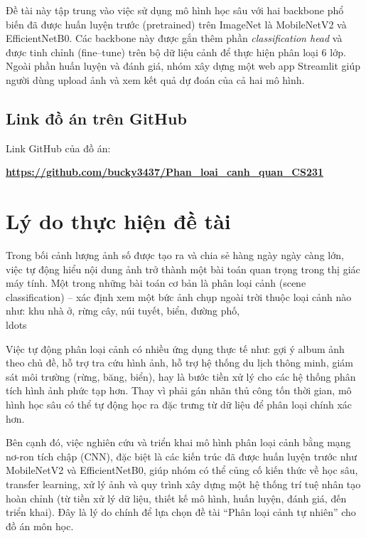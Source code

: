 \documentclass[12pt,a4paper]{article}
\begin{document}
Đề tài này tập trung vào việc sử dụng mô hình học sâu với hai backbone phổ biến đã được huấn luyện trước (pretrained) trên ImageNet là MobileNetV2 và EfficientNetB0. Các backbone này được gắn thêm phần \emph{classification head} và được tinh chỉnh (fine--tune) trên bộ dữ liệu cảnh để thực hiện phân loại 6 lớp. Ngoài phần huấn luyện và đánh giá, nhóm xây dựng một web app Streamlit giúp người dùng upload ảnh và xem kết quả dự đoán của cả hai mô hình.

\subsection{Link đồ án trên GitHub}
Link GitHub của đồ án:
\begin{center}
    \textbf{\url{https://github.com/bucky3437/Phan_loai_canh_quan_CS231}}
\end{center}

\section{Lý do thực hiện đề tài}\label{sec:ly-do}

Trong bối cảnh lượng ảnh số được tạo ra và chia sẻ hàng ngày ngày càng lớn, việc tự động hiểu nội dung ảnh trở thành một bài toán quan trọng trong thị giác máy tính. Một trong những bài toán cơ bản là phân loại cảnh (scene classification) -- xác định xem một bức ảnh chụp ngoài trời thuộc loại cảnh nào như: khu nhà ở, rừng cây, núi tuyết, biển, đường phố, \\ldots

Việc tự động phân loại cảnh có nhiều ứng dụng thực tế như: gợi ý album ảnh theo chủ đề, hỗ trợ tra cứu hình ảnh, hỗ trợ hệ thống du lịch thông minh, giám sát môi trường (rừng, băng, biển), hay là bước tiền xử lý cho các hệ thống phân tích hình ảnh phức tạp hơn. Thay vì phải gán nhãn thủ công tốn thời gian, mô hình học sâu có thể tự động học ra đặc trưng từ dữ liệu để phân loại chính xác hơn.

Bên cạnh đó, việc nghiên cứu và triển khai mô hình phân loại cảnh bằng mạng nơ-ron tích chập (CNN), đặc biệt là các kiến trúc đã được huấn luyện trước như MobileNetV2 và EfficientNetB0, giúp nhóm có thể củng cố kiến thức về học sâu, transfer learning, xử lý ảnh và quy trình xây dựng một hệ thống trí tuệ nhân tạo hoàn chỉnh (từ tiền xử lý dữ liệu, thiết kế mô hình, huấn luyện, đánh giá, đến triển khai). Đây là lý do chính để lựa chọn đề tài ``Phân loại cảnh tự nhiên'' cho đồ án môn học.
\end{document}
